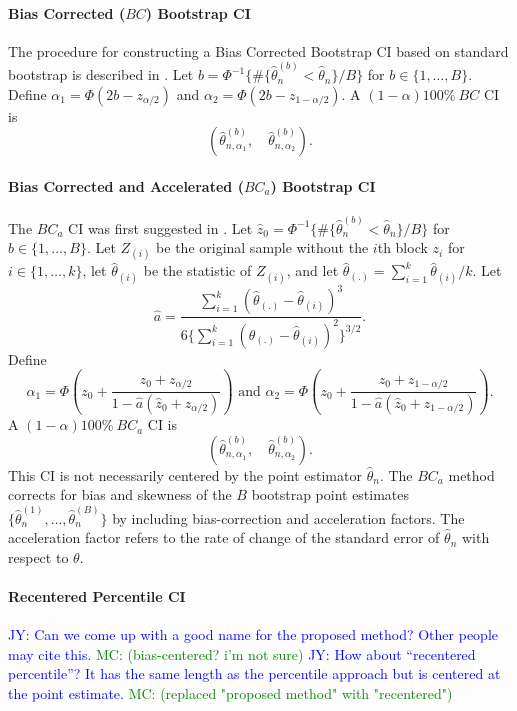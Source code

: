 \documentclass[12pt, letterpaper, titlepage]{article}
\newcommand{\jy}[1]{\textcolor{blue}{JY: #1}}
\newcommand{\mc}[1]{\textcolor{green}{MC: (#1)}}
\begin{document}
\paragraph{Bias Corrected ($BC$) Bootstrap CI}
The procedure for constructing a Bias Corrected Bootstrap CI based on standard
bootstrap is described in \citet{carpenter2000bootstrap}. Let
$b = \Phi^{-1}\{\#\{\hat\theta_n^{(b)} < \hat{\theta}_n\} / B\}$ for
$b \in \{1, \ldots, B\}$. Define $\alpha_1 = \Phi(2b - z_{\alpha/2})$ and 
$\alpha_2 = \Phi(2b - z_{1 - \alpha/2})$. A $(1 - \alpha)100\%~BC$ CI is
\[
(\hat\theta_{n, \alpha_1}^{(b)}, \quad \hat\theta_{n, \alpha_2}^{(b)}).
\]


\paragraph{Bias Corrected and Accelerated ($BC_a$) Bootstrap CI}
The $BC_a$ CI was first suggested in \citet{efron1987better}. Let
$\hat{z}_0 = \Phi^{-1}\{\#\{\hat\theta_n^{(b)} < \hat{\theta}_n\} / B\}$ for
$b \in \{1, \ldots, B\}$. Let $Z_{(i)}$ be the original sample without the
$i$th block $z_i$ for $i \in \{1, \ldots, k\}$, let $\hat{\theta}_{(i)}$ be
the statistic of $Z_{(i)}$, and let
$\hat{\theta}_{(.)} = \sum_{i=1}^{k} \hat{\theta}_{(i)} / k$. 
Let 
\[
\hat{a} = \frac{\sum_{i=1}^{k} (\hat{\theta}_{(.)} -
  \hat{\theta}_{(i)})^3}{6\{\sum_{i=1}^{k} (\hat{\theta}_{(.)} -
  \hat{\theta}_{(i)})^2\}^{3/2}}.
\]
Define
\[
\alpha_1 = \Phi\left(z_0 + \frac{z_{0} +
  z_{\alpha/2}}{1 - \hat{a}(\hat{z}_{0} + z_{\alpha/2})}\right)
\text{ and }
\alpha_2 = \Phi\left(z_0 + \frac{z_{0} +
  z_{1 - \alpha/2}}{1 - \hat{a}(\hat{z}_{0} + z_{1 - \alpha/2})}\right).
\]
A $(1 - \alpha)100\%~BC_a$ CI is
\[
(\hat\theta_{n, \alpha_1}^{(b)}, \quad \hat\theta_{n, \alpha_2}^{(b)}).
\]
This CI is not necessarily centered by the point estimator $\hat\theta_n$. The
$BC_a$ method corrects for bias and skewness of the $B$ bootstrap point
estimates $\{\hat\theta_n^{(1)}, \ldots, \hat\theta_n^{(B)}\}$ by including
bias-correction and acceleration factors. The acceleration factor refers to
the rate of change of the standard error of $\hat\theta_n$ with respect to
$\theta$.


\paragraph{Recentered Percentile CI}
\jy{Can we come up with a good name for the proposed method? Other people may cite this.} \mc{bias-centered? i'm not sure}
\jy{How about ``recentered percentile''? It has the same length as the
  percentile approach but is centered at the point estimate.} \mc{replaced "proposed
  method" with "recentered"}
\end{document}
